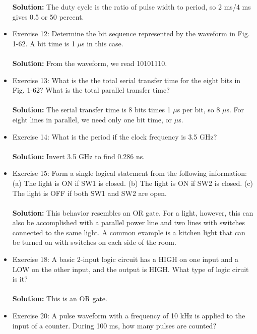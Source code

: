 \documentclass{article}
\begin{document}
\begin{itemize}
    \textbf{Solution:}  The duty cycle is the ratio of pulse width to period, so 2 ms/4 ms gives 0.5 or 50 percent. \\
    \item Exercise 12: Determine the bit sequence represented by the waveform in Fig. 1-62.  A bit time is 1 $\mu$s in this case. \\ \\
    \textbf{Solution:} From the waveform, we read 10101110. \\
    \item Exercise 13: What is the the total serial transfer time for the eight bits in Fig. 1-62?  What is the total parallel transfer time? \\ \\
    \noindent
    \textbf{Solution:} The serial transfer time is 8 bits times 1 $\mu$s per bit, so 8 $\mu$s.  For eight lines in parallel, we need only one bit time, or $\mu$s. \\
    \item Exercise 14: What is the period if the clock frequency is 3.5 GHz? \\ \\
    \noindent
    \textbf{Solution:} Invert 3.5 GHz to find 0.286 ns. \\
    \item Exercise 15: Form a single logical statement from the following information: (a) The light is ON if SW1 is closed. (b) The light is ON if SW2 is closed. (c) The light is OFF if both SW1 and SW2 are open. \\ \\
    \noindent
    \textbf{Solution:} This behavior resembles an OR gate.  For a light, however, this can also be accomplished with a parallel power line and two lines with switches connected to the same light.  A common example is a kitchen light that can be turned on with switches on each side of the room.  \\
    \item Exercise 18: A basic 2-input logic circuit has a HIGH on one input and a LOW on the other input, and the output is HIGH.  What type of logic ciruit is it? \\ \\
    \noindent
    \textbf{Solution:}  This is an OR gate. \\
    \item Exercise 20: A pulse waveform with a frequency of 10 kHz is applied to the input of a counter.  During 100 ms, how many pulses are counted? \\ \\

\end{itemize}
\end{document}
